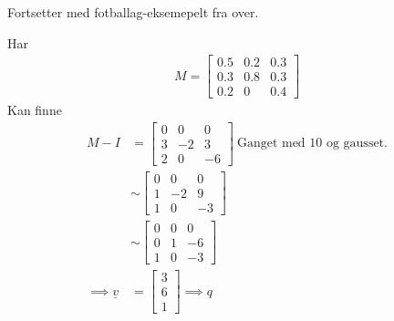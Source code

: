 \documentclass[11pt, a4paper, norsk]{article}
\begin{document}
            \begin{Example}{}{}
                Fortsetter med fotballag-eksemepelt fra over.

                Har \begin{align*}
                    M = \begin{bmatrix}
                        0.5 & 0.2 & 0.3 \\
                        0.3 & 0.8 & 0.3 \\
                        0.2 & 0 & 0.4
                    \end{bmatrix}
                \end{align*}
                Kan finne \begin{align*}
                    M - I &= \begin{bmatrix}
                        0 & 0 & 0 \\
                        3 & -2 & 3 \\
                        2 & 0 & - 6
                    \end{bmatrix} \: \text{Ganget med 10 og gausset.}
                    \\
                          &\sim \begin{bmatrix}
                              0 & 0 & 0 \\
                              1 & -2 & 9 \\
                              1 & 0 & -3
                          \end{bmatrix}
                          \\
                          &\sim \begin{bmatrix}
                              0 & 0 & 0 \\
                              0 & 1 & -6 \\
                              1 & 0 & -3
                          \end{bmatrix}
                          \\
                        \implies \underline{v} &= \begin{bmatrix}
                            3 \\
                            6 \\
                            1
                        \end{bmatrix} \implies q
                \end{align*}
            \end{Example}
\end{document}

